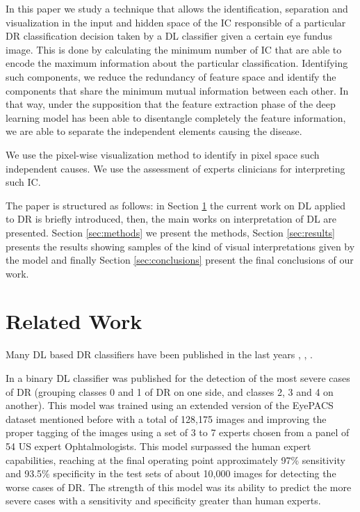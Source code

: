 \documentclass[review]{elsarticle}
\theoremstyle{definition} %
\theoremstyle{remark}
\begin{document}
In this paper we study a technique that allows the identification, separation and visualization in the input and hidden space of the IC responsible of a particular DR classification decision taken by a DL classifier given a certain eye fundus image. This is done by calculating the minimum number of IC that are able to encode the maximum information about the particular classification. Identifying such components, we reduce the redundancy of feature space and identify the components that share the minimum mutual information between each other. In that way, under the supposition that the feature extraction phase of the deep learning model has been able to disentangle completely the feature information, we are able to separate the independent elements causing the disease.

We use the pixel-wise visualization method to identify in pixel space such independent causes. We use the assessment of experts clinicians for interpreting such IC.

The paper is structured as follows: in Section \ref{sec:related} the current work on DL applied to DR is briefly introduced, then, the main works on interpretation of DL are presented. Section \ref{sec:methods} we present the methods, Section \ref{sec:results} presents the results showing samples of the kind of visual interpretations given by the model and finally Section \ref{sec:conclusions} present the final conclusions of our work.

\section{Related Work}\label{sec:related}

Many DL based DR classifiers have been published in the last years \cite{pratt2016convolutional}, \cite{DELATORRE2017}, \cite{doi:10.1001/jama.2016.17216}. 

In \cite{doi:10.1001/jama.2016.17216} a binary DL classifier was published for the detection of the most severe cases of DR (grouping classes 0 and 1 of DR on one side, and classes 2, 3 and 4 on another). This model was trained using an extended version of the EyePACS dataset mentioned before with a total of 128,175 images and improving the proper tagging of the images using a set of 3 to 7 experts chosen from a panel of 54 US expert Ophtalmologists. This model surpassed the human expert capabilities, reaching at the final operating point approximately  97\% sensitivity and 93.5\% specificity in the test sets of about 10,000 images for detecting the worse cases of DR. The strength of this model was its ability to predict the more severe cases with a sensitivity and specificity greater than human experts. 
\end{document}
